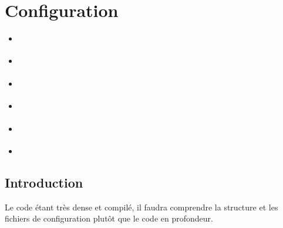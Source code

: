 \documentclass[letterpaper,10pt,french]{sphinxmanual}
\begin{document}
\sphinxstepscope


\section{Configuration}
\label{\detokenize{doc_instal/configuration:configuration}}\label{\detokenize{doc_instal/configuration::doc}}
\begin{sphinxShadowBox}
\begin{itemize}
\item {} 
\sphinxAtStartPar
{}\label{\detokenize{doc_instal/configuration:id1}}{\hyperref[\detokenize{doc_instal/configuration:introduction}]{}}

\item {} 
\sphinxAtStartPar
{}\label{\detokenize{doc_instal/configuration:id2}}{\hyperref[\detokenize{doc_instal/configuration:localisation-des-differents-repertoires}]{}}

\item {} 
\sphinxAtStartPar
{}\label{\detokenize{doc_instal/configuration:id3}}{\hyperref[\detokenize{doc_instal/configuration:fichiers-de-configuration-du-datadir}]{}}

\item {} 
\sphinxAtStartPar
{}\label{\detokenize{doc_instal/configuration:id4}}{\hyperref[\detokenize{doc_instal/configuration:versionnement-des-modules}]{}}

\item {} 
\sphinxAtStartPar
{}\label{\detokenize{doc_instal/configuration:id5}}{\hyperref[\detokenize{doc_instal/configuration:base-de-donnee}]{}}

\item {} 
\sphinxAtStartPar
{}\label{\detokenize{doc_instal/configuration:id6}}{\hyperref[\detokenize{doc_instal/configuration:relancer-l-infrastructure}]{}}

\end{itemize}
\end{sphinxShadowBox}


\subsection{Introduction}
\label{\detokenize{doc_instal/configuration:introduction}}
\sphinxAtStartPar
Le code étant très dense et compilé, il faudra comprendre la structure et les fichiers de configuration plutôt que le code en profondeur.
\end{document}
